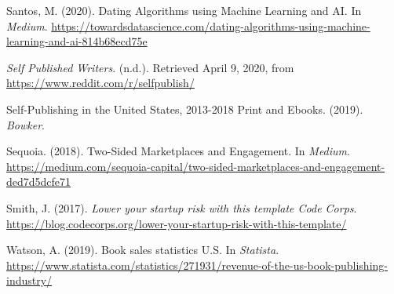 \documentclass[10pt,openany]{book}
\newlength{\cslhangindent}
\newenvironment{cslreferences}%
  {\setlength{\parindent}{0pt}%
  \everypar{\setlength{\hangindent}{\cslhangindent}}\ignorespaces}%
  {\par}
\begin{document}
\begin{cslreferences}
\leavevmode\hypertarget{ref-santos_dating_2020}{}%
Santos, M. (2020). Dating Algorithms using Machine Learning and AI. In
\emph{Medium}.
\url{https://towardsdatascience.com/dating-algorithms-using-machine-learning-and-ai-814b68ecd75e}

\leavevmode\hypertarget{ref-noauthor_self_nodate}{}%
\emph{Self Published Writers}. (n.d.). Retrieved April 9, 2020, from
\url{https://www.reddit.com/r/selfpublish/}

\leavevmode\hypertarget{ref-bowker_self-publishing_2019}{}%
Self-Publishing in the United States, 2013-2018 Print and Ebooks.
(2019). \emph{Bowker}.

\leavevmode\hypertarget{ref-sequoia_two-sided_2018}{}%
Sequoia. (2018). Two-Sided Marketplaces and Engagement. In
\emph{Medium}.
\url{https://medium.com/sequoia-capital/two-sided-marketplaces-and-engagement-ded7d5dcfe71}

\leavevmode\hypertarget{ref-smith_lower_nodate}{}%
Smith, J. (2017). \emph{Lower your startup risk with this template Code
Corps}.
\url{https://blog.codecorps.org/lower-your-startup-risk-with-this-template/}

\leavevmode\hypertarget{ref-statista_book_2020}{}%
Watson, A. (2019). Book sales statistics U.S. In \emph{Statista}.
\url{https://www.statista.com/statistics/271931/revenue-of-the-us-book-publishing-industry/}
\end{cslreferences}

\end{document}
